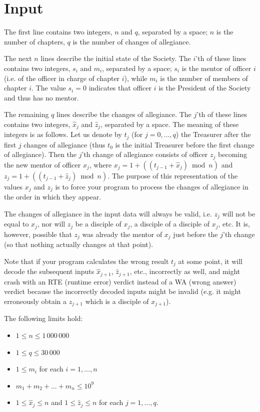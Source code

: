 \section*{Input}
The first line contains two integers, $n$ and $q$, separated by a space; $n$ is
the number of chapters, $q$ is the number of changes of allegiance.

The next $n$ lines describe the initial state of the Society. The $i$'th of these
lines contains two integers, $s_i$ and $m_i$, separated by a space; $s_i$ is the
mentor of officer $i$ (i.e. of the officer in charge of chapter $i$), while $m_i$
is the number of members of chapter $i$. The value $s_i = 0$ indicates that
officer $i$ is the President of the Society and thus has no mentor.

The remaining $q$ lines describe the changes of allegiance. The $j$'th of these
lines contains two integers, $\hat{x}_j$ and $\hat{z}_j$, separated by a space.
The meaning of these integers is as follows. Let us denote by $t_j$ (for
$j = 0, \ldots, q$) the Treasurer after the first $j$ changes of allegiance (thus
$t_0$ is the initial Treasurer before the first change of allegiance). Then the
$j$'th change of allegiance consists of officer $z_j$ becoming the new mentor of
officer $x_j$, where $x_j = 1 + ((t_{j-1} + \hat{x}_j) \bmod n)$ and
$z_j = 1 + ((t_{j-1} + \hat{z}_j) \bmod n)$. The purpose of this representation
of the values $x_j$ and $z_j$ is to force your program to process the changes of
allegiance in the order in which they appear.

The changes of allegiance in the input data will always be valid, i.e. $z_j$ will
not be equal to $x_j$, nor will $z_j$ be a disciple of $x_j$, a disciple of a
disciple of $x_j$, etc. It is, however, possible that $z_j$ was already the
mentor of $x_j$ just before the $j$'th change (so that nothing actually changes
at that point).

Note that if your program calculates the wrong result $t_j$ at some point, it
will decode the subsequent inputs $\hat{x}_{j+1}$, $\hat{z}_{j+1}$, etc.,
incorrectly as well, and might crash with an RTE (runtime error) verdict instead
of a WA (wrong answer) verdict because the incorrectly decoded inputs might be
invalid (e.g. it might erroneously obtain a $z_{j+1}$ which is a disciple of
$x_{j+1}$).

The following limits hold:
\begin{itemize}
  \item $1 \leq n \leq 1\,000\,000$
  \item $1 \leq q \leq 30\,000$
  \item $1 \leq m_i$ for each $i = 1, \ldots, n$
  \item $m_1 + m_2 + \ldots + m_n \leq 10^9$
  \item $1 \leq \hat{x}_j \leq n$ and $1 \leq \hat{z}_j \leq n$ for each
        $j = 1, \ldots, q$.
\end{itemize}

